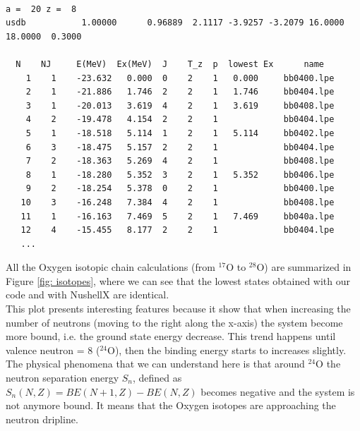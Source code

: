 \documentclass[twoside]{article}
\begin{document}
\begin{lstlisting}[label=nushellx, caption= \texttt{o\_20b.lpt} output from NushellX.]

a =  20 z =  8
usdb           1.00000      0.96889  2.1117 -3.9257 -3.2079 16.0000 18.0000  0.3000

  N    NJ     E(MeV)  Ex(MeV)  J    T_z  p  lowest Ex      name
    1    1    -23.632   0.000  0    2    1   0.000     bb0400.lpe          
    2    1    -21.886   1.746  2    2    1   1.746     bb0404.lpe          
    3    1    -20.013   3.619  4    2    1   3.619     bb0408.lpe          
    4    2    -19.478   4.154  2    2    1             bb0404.lpe          
    5    1    -18.518   5.114  1    2    1   5.114     bb0402.lpe          
    6    3    -18.475   5.157  2    2    1             bb0404.lpe          
    7    2    -18.363   5.269  4    2    1             bb0408.lpe          
    8    1    -18.280   5.352  3    2    1   5.352     bb0406.lpe          
    9    2    -18.254   5.378  0    2    1             bb0400.lpe          
   10    3    -16.248   7.384  4    2    1             bb0408.lpe          
   11    1    -16.163   7.469  5    2    1   7.469     bb040a.lpe          
   12    4    -15.455   8.177  2    2    1             bb0404.lpe
   ...
\end{lstlisting}



All the Oxygen isotopic chain calculations (from $^{17}$O to $^{28}$O) are summarized in Figure \ref{fig: isotopes}, where we can see that the lowest states obtained with our code and with NushellX are identical. \\
This plot presents interesting features because it show that when increasing the number of neutrons (moving to the right along the x-axis) the system become more bound, i.e. the ground state energy decrease. This trend happens until valence neutron = 8 ($^{24}$O), then the binding energy starts to increases slightly. The physical phenomena that we can understand here is that around $^{24}$O the neutron separation energy $S_n$, defined as $S_n (N,Z)= BE(N+1,Z)-BE(N,Z)$ becomes negative and the system is not anymore bound. It means that the Oxygen isotopes are approaching the neutron dripline.
 
\end{document}
